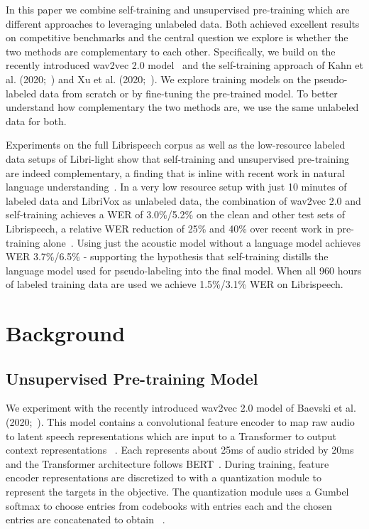\documentclass{article}
\newcommand{\vox}{LibriVox}
\newcommand{\libri}{Librispeech}
\newcommand{\libril}{Libri-light}
\begin{document}
In this paper we combine self-training and unsupervised pre-training which are different approaches to leveraging unlabeled data. 
Both achieved excellent results on competitive benchmarks and the central question we explore is whether the two methods are complementary to each other.
Specifically, we build on the recently introduced wav2vec 2.0 model~\cite{baevski2020wav} and the self-training approach of Kahn et al. (2020;~\cite{kahn2020st}) and Xu et al. (2020;~\cite{xu2020iterative}).
We explore training models on the pseudo-labeled data from scratch or by fine-tuning the pre-trained model.
To better understand how complementary the two methods are, we use the same unlabeled data for both.

Experiments on the full \libri{} corpus as well as the low-resource labeled data setups of \libril{} show that self-training and unsupervised pre-training are indeed complementary, a finding that is inline with recent work in natural language understanding~\cite{du2020selftraining}.
In a very low resource setup with just 10 minutes of labeled data and \vox{} as unlabeled data, the combination of wav2vec 2.0 and self-training achieves a WER of 3.0\%/5.2\% on the clean and other test sets of Librispeech, a relative WER reduction of 25\% and 40\% over recent work in pre-training alone~\cite{baevski2020wav}.
Using just the acoustic model without a language model achieves WER 3.7\%/6.5\% - supporting the hypothesis that self-training distills the language model used for pseudo-labeling into the final model. 
When all 960 hours of labeled training data are used we achieve 1.5\%/3.1\% WER on \libri{}.





\section{Background}
\label{sec:format}

\subsection{Unsupervised Pre-training Model}

We experiment with the recently introduced wav2vec 2.0 model of Baevski et al. (2020;~\cite{baevski2020wav}).
This model contains a convolutional feature encoder  to map raw audio~ to latent speech representations  which are input to a Transformer  to output context representations ~\cite{devlin2018bert,baevski2019vqwav2vec,baevski2019effectiveness}.
Each  represents about 25ms of audio strided by 20ms and the Transformer architecture follows BERT~\cite{vaswani2017transformer,devlin2018bert}.
During training, feature encoder representations are discretized to  with a quantization module  to represent the targets in the objective.
The quantization module uses a Gumbel softmax to choose entries from  codebooks with  entries each and the chosen entries are concatenated to obtain ~\cite{jegou2011ieee,jang2016gumbel,baevski2019vqwav2vec}.
\end{document}
